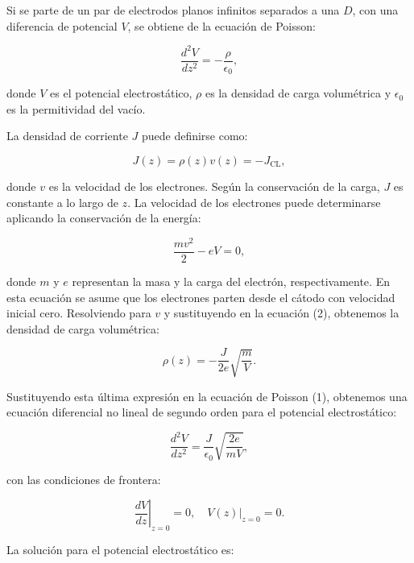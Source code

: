 Si se parte de un par de electrodos planos infinitos separados a una \( D \), con una diferencia de potencial \( V \), se obtiene de la ecuación de Poisson:

\begin{equation}
	\frac{d^2 V}{dz^2} = -\frac{\rho}{\epsilon_0},
\end{equation}

donde \( V \) es el potencial electrostático, \( \rho \) es la densidad de carga volumétrica y \( \epsilon_0 \) es la permitividad del vacío.

La densidad de corriente \( J \) puede definirse como:

\begin{equation}
	J(z) = \rho(z) v(z) = -J_\text{CL},
\end{equation}

donde \( v \) es la velocidad de los electrones. Según la conservación de la carga, \( J \) es constante a lo largo de \( z \). La velocidad de los electrones puede determinarse aplicando la conservación de la energía:

\begin{equation}
	\frac{m v^2}{2} - e V = 0,
\end{equation}

donde \( m \) y \( e \) representan la masa y la carga del electrón, respectivamente. En esta ecuación se asume que los electrones parten desde el cátodo con velocidad inicial cero. Resolviendo para \( v \) y sustituyendo en la ecuación (2), obtenemos la densidad de carga volumétrica:

\begin{equation}
	\label{eq:otrarho}
	\rho(z) = -\frac{J}{2e} \sqrt{\frac{m}{V}}.
\end{equation}

Sustituyendo esta última expresión en la ecuación de Poisson (1), obtenemos una ecuación diferencial no lineal de segundo orden para el potencial electrostático:

\begin{equation}
	\frac{d^2 V}{dz^2} = \frac{J}{\epsilon_0} \sqrt{\frac{2e}{m V}},
\end{equation}

con las condiciones de frontera:

\begin{equation}
	\left.\frac{dV}{dz}\right|_{z=0} = 0, \quad V(z)|_{z=0} = 0.
\end{equation}

La solución para el potencial electrostático es:

